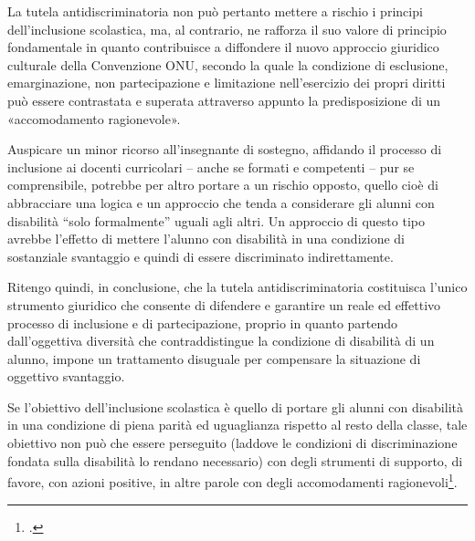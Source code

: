 La tutela antidiscriminatoria non può pertanto mettere a rischio i principi dell'inclusione scolastica, ma, al contrario, ne rafforza il suo valore di principio fondamentale in quanto contribuisce a diffondere il nuovo approccio giuridico culturale della Convenzione ONU, secondo la quale la condizione di esclusione, emarginazione, non partecipazione e limitazione nell'esercizio dei propri diritti può essere contrastata e superata attraverso appunto la predisposizione di un «accomodamento ragionevole».

Auspicare un minor ricorso all'insegnante di sostegno, affidando il processo di inclusione ai docenti curricolari – anche se formati e competenti – pur se comprensibile, potrebbe per altro portare a un rischio opposto, quello cioè di abbracciare una logica e un approccio che tenda a considerare gli alunni con disabilità “solo formalmente” uguali agli altri. Un approccio di questo tipo avrebbe l'effetto di mettere l'alunno con disabilità in una condizione di sostanziale svantaggio e quindi di essere discriminato indirettamente.

Ritengo quindi, in conclusione, che la tutela antidiscriminatoria costituisca l'unico strumento giuridico che consente di difendere e garantire un reale ed effettivo processo di inclusione e di partecipazione, proprio in quanto partendo dall'oggettiva diversità che contraddistingue la condizione di disabilità di un alunno, impone un trattamento disuguale per compensare la situazione di oggettivo svantaggio.

Se l'obiettivo dell'inclusione scolastica è quello di portare gli alunni con disabilità in una condizione di piena parità ed uguaglianza rispetto al resto della classe, tale obiettivo non può che essere perseguito (laddove le condizioni di discriminazione fondata sulla disabilità lo rendano necessario) con degli strumenti di supporto, di favore, con azioni positive, in altre parole con degli accomodamenti ragionevoli\footcite{Luca2014}.

